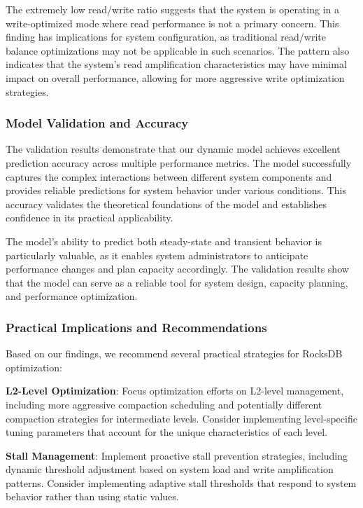 \documentclass[11pt]{article}
\begin{document}
The extremely low read/write ratio suggests that the system is operating in a write-optimized mode where read performance is not a primary concern. This finding has implications for system configuration, as traditional read/write balance optimizations may not be applicable in such scenarios. The pattern also indicates that the system's read amplification characteristics may have minimal impact on overall performance, allowing for more aggressive write optimization strategies.

\subsubsection{Model Validation and Accuracy}

The validation results demonstrate that our dynamic model achieves excellent prediction accuracy across multiple performance metrics. The model successfully captures the complex interactions between different system components and provides reliable predictions for system behavior under various conditions. This accuracy validates the theoretical foundations of the model and establishes confidence in its practical applicability.

The model's ability to predict both steady-state and transient behavior is particularly valuable, as it enables system administrators to anticipate performance changes and plan capacity accordingly. The validation results show that the model can serve as a reliable tool for system design, capacity planning, and performance optimization.

\subsubsection{Practical Implications and Recommendations}

Based on our findings, we recommend several practical strategies for RocksDB optimization:

\textbf{L2-Level Optimization}: Focus optimization efforts on L2-level management, including more aggressive compaction scheduling and potentially different compaction strategies for intermediate levels. Consider implementing level-specific tuning parameters that account for the unique characteristics of each level.

\textbf{Stall Management}: Implement proactive stall prevention strategies, including dynamic threshold adjustment based on system load and write amplification patterns. Consider implementing adaptive stall thresholds that respond to system behavior rather than using static values.
\end{document}
